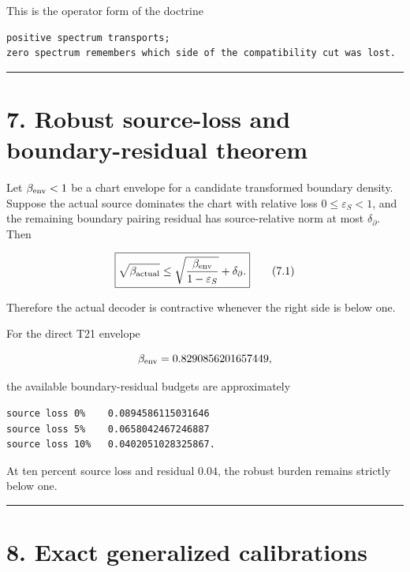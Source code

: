 This is the operator form of the doctrine

\begin{verbatim}
positive spectrum transports;
zero spectrum remembers which side of the compatibility cut was lost.
\end{verbatim}

\begin{center}\rule{0.5\linewidth}{0.5pt}\end{center}

\hypertarget{robust-source-loss-and-boundary-residual-theorem}{%
\section{7. Robust source-loss and boundary-residual theorem}\label{robust-source-loss-and-boundary-residual-theorem}}

Let \(\beta_{\rm env}<1\) be a chart envelope for a candidate transformed
boundary density. Suppose the actual source dominates the chart with relative
loss \(0\le\varepsilon_S<1\), and the remaining boundary pairing residual has
source-relative norm at most \(\delta_\partial\). Then

\[
\boxed{
\sqrt{\beta_{\rm actual}}
\le
\sqrt{\frac{\beta_{\rm env}}{1-\varepsilon_S}}
+\delta_\partial.
}
\tag{7.1}
\]

Therefore the actual decoder is contractive whenever the right side is below
one.

For the direct T21 envelope

\[
\beta_{\rm env}=0.8290856201657449,
\]

the available boundary-residual budgets are approximately

\begin{verbatim}
source loss 0%    0.0894586115031646
source loss 5%    0.0658042467246887
source loss 10%   0.0402051028325867.
\end{verbatim}

At ten percent source loss and residual \(0.04\), the robust burden remains
strictly below one.

\begin{center}\rule{0.5\linewidth}{0.5pt}\end{center}

\hypertarget{exact-generalized-calibrations}{%
\section{8. Exact generalized calibrations}\label{exact-generalized-calibrations}}

